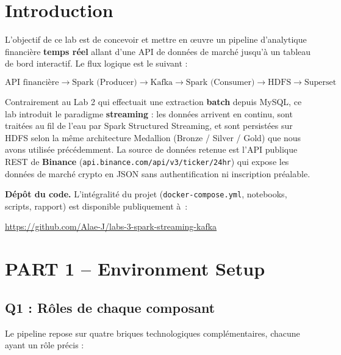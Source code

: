 \documentclass{RapportINPTCLOUD}
\begin{document}
\fairemarges
\fairepagedegarde
\tabledematieres

\section{Introduction}

L'objectif de ce lab est de concevoir et mettre en \oe{}uvre un pipeline d'analytique financi\`{e}re \textbf{temps r\'{e}el} allant d'une API de donn\'{e}es de march\'{e} jusqu'\`{a} un tableau de bord interactif. Le flux logique est le suivant :

\[
\text{API financi\`{e}re} \rightarrow \text{Spark (Producer)} \rightarrow \text{Kafka} \rightarrow \text{Spark (Consumer)} \rightarrow \text{HDFS} \rightarrow \text{Superset}
\]

Contrairement au Lab 2 qui effectuait une extraction \textbf{batch} depuis MySQL, ce lab introduit le paradigme \textbf{streaming} : les donn\'{e}es arrivent en continu, sont trait\'{e}es au fil de l'eau par Spark Structured Streaming, et sont persist\'{e}es sur HDFS selon la m\^{e}me architecture Medallion (Bronze / Silver / Gold) que nous avons utilis\'{e}e pr\'{e}c\'{e}demment. La source de donn\'{e}es retenue est l'API publique REST de \textbf{Binance} (\texttt{api.binance.com/api/v3/ticker/24hr}) qui expose les donn\'{e}es de march\'{e} crypto en JSON sans authentification ni inscription pr\'{e}alable.

\textbf{D\'{e}p\^{o}t du code.} L'int\'{e}gralit\'{e} du projet (\texttt{docker-compose.yml}, notebooks, scripts, rapport) est disponible publiquement \`{a}~:
\begin{center}
\url{https://github.com/Alae-J/labs-3-spark-streaming-kafka}
\end{center}

\section{PART 1 -- Environment Setup}

\subsection{Q1 : R\^{o}les de chaque composant}

Le pipeline repose sur quatre briques technologiques compl\'{e}mentaires, chacune ayant un r\^{o}le pr\'{e}cis :
\end{document}
